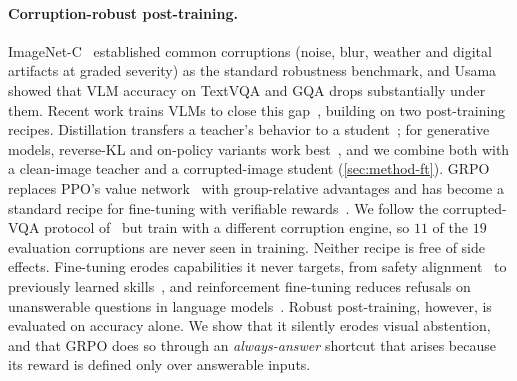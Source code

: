 \paragraph{Corruption-robust post-training.}
ImageNet-C~\cite{hendrycks2019imagenetc} established common corruptions (noise, blur,
weather and digital artifacts at graded severity) as the standard robustness benchmark,
and Usama~\etal~\cite{usama2025analysing} showed that VLM accuracy on TextVQA and GQA drops
substantially under them. Recent work trains VLMs to close this
gap~\cite{he2026videoreasoningmodelsready,tang2026robustr1,liu2026roma}, building on two
post-training recipes. Distillation transfers a teacher's behavior to a
student~\cite{hinton2015distilling,kim2016sequence}; for generative models, reverse-KL
and on-policy variants work best~\cite{gu2024minillm,agarwal2024onpolicydistillationlanguagemodels},
and we combine both with a clean-image teacher and a corrupted-image student
(\cref{sec:method-ft}). GRPO~\cite{shao2024deepseekmath} replaces PPO's value
network~\cite{schulman2017ppo} with group-relative advantages and has become a standard
recipe for fine-tuning with verifiable rewards~\cite{guo2025deepseekr1,liu2025visualrft}.
We follow the corrupted-VQA protocol of~\cite{usama2025analysing} but train with a
different corruption engine, so $11$ of the $19$ evaluation corruptions are never seen in
training. Neither recipe is free of side effects. Fine-tuning erodes capabilities it never
targets, from safety alignment~\cite{qi2024finetuning} to previously learned
skills~\cite{kirkpatrick2017overcoming,luo2023empirical,zhai2024forgetting}, and
reinforcement fine-tuning reduces refusals on unanswerable questions in language
models~\cite{song2025hallucinationtax}. Robust post-training, however, is evaluated on
accuracy alone. We show that it silently erodes visual abstention, and that GRPO does so
through an \emph{always-answer} shortcut that arises because its reward is defined only
over answerable inputs.

